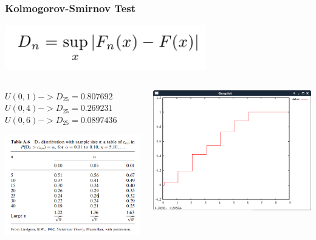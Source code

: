 \documentclass{beamer}
\begin{document}
\begin{frame}
\frametitle{Kolmogorov-Smirnov Test}
\begin{center}
\includegraphics[scale=0.35]{kst1}
\end{center}
\begin{columns}
\begin{column}{0.5\textwidth}
\begin{center}
$U(0,1) -> D_{25} = 0.807692$
$U(0,4) -> D_{25} = 0.269231$
$U(0,6) -> D_{25} = 0.0897436$
\end{center}


\includegraphics[scale=0.38]{kst2}
\end{column}
\begin{column}{0.5\textwidth}
\includegraphics[scale=0.25]{kst3}
\end{column}
\end{columns}
\end{frame}
\end{document}
